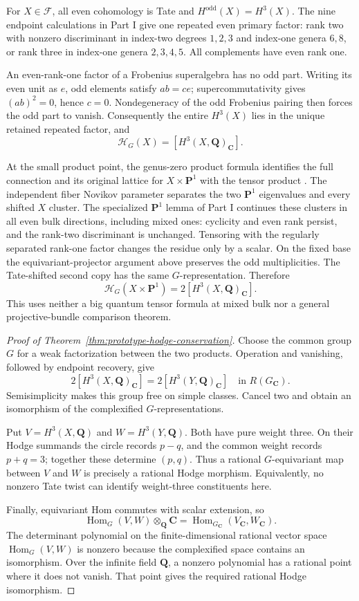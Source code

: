 \documentclass[11pt]{article}
\newcommand{\Q}{\mathbf Q}
\newcommand{\C}{\mathbf C}
\newcommand{\PP}{\mathbf P}
\newcommand{\odd}{\mathrm{odd}}
\newcommand{\Hom}{\operatorname{Hom}}
\begin{document}
For $X\in\mathcal F$, all even cohomology is Tate and
$H^\odd(X)=H^3(X)$. The nine endpoint calculations in Part I give one
repeated even primary factor: rank two with nonzero discriminant in
index-two degrees $1,2,3$ and index-one genera $6,8$, or rank three in
index-one genera $2,3,4,5$. All complements have even rank one.

An even-rank-one factor of a Frobenius superalgebra has no odd part.
Writing its even unit as $e$, odd elements satisfy $ab=ce$; supercommutativity
gives $(ab)^2=0$, hence $c=0$. Nondegeneracy of the odd Frobenius pairing
then forces the odd part to vanish. Consequently the entire $H^3(X)$
lies in the unique retained repeated factor, and
\[
 \mathcal H_G(X)=[H^3(X,\Q)_\C].
\]

At the small product point, the genus-zero product formula identifies the
full connection and its original lattice for $X\times\PP^1$ with the
tensor product \cite[formula~(1)]{Behrend}. The independent fiber Novikov
parameter separates the two $\PP^1$ eigenvalues and every shifted
$X$ cluster. The specialized $\PP^1$ lemma of Part I continues these
clusters in all even bulk directions, including mixed ones: cyclicity and
even rank persist, and the rank-two discriminant is unchanged. Tensoring
with the regularly separated rank-one factor changes the residue only
by a scalar. On the fixed base the equivariant-projector argument above
preserves the odd multiplicities. The Tate-shifted second copy has the
same $G$-representation. Therefore
\[
 \mathcal H_G(X\times\PP^1)=2[H^3(X,\Q)_\C].
\]
This uses neither a big quantum tensor formula at mixed bulk nor a general
projective-bundle comparison theorem.

\begin{proof}[Proof of Theorem~\ref{thm:prototype-hodge-conservation}]
Choose the common group $G$ for a weak factorization between the two
products. Operation and vanishing, followed by endpoint recovery, give
\[
 2[H^3(X,\Q)_\C]=2[H^3(Y,\Q)_\C]\quad\text{in }R(G_\C).
\]
Semisimplicity makes this group free on simple classes. Cancel two and
obtain an isomorphism of the complexified $G$-representations.

Put $V=H^3(X,\Q)$ and $W=H^3(Y,\Q)$. Both have pure weight three.
On their Hodge summands the circle records $p-q$, and the common weight
records $p+q=3$; together these determine $(p,q)$. Thus a rational
$G$-equivariant map between $V$ and $W$ is precisely a rational Hodge
morphism. Equivalently, no nonzero Tate twist can identify weight-three
constituents here.

Finally, equivariant Hom commutes with scalar extension, so
\[
 \Hom_G(V,W)\otimes_\Q\C
   =\Hom_{G_\C}(V_\C,W_\C).
\]
The determinant polynomial on the finite-dimensional rational vector space
$\Hom_G(V,W)$ is nonzero because the complexified space contains an
isomorphism. Over the infinite field $\Q$, a nonzero polynomial has a
rational point where it does not vanish. That point gives the required
rational Hodge isomorphism.
\end{proof}
\end{document}
